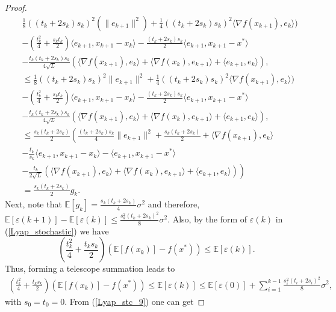 \documentclass{article}
\theoremstyle{plain}
\theoremstyle{definition}
\theoremstyle{remark}
\begin{document}
\begin{proof}
\begin{align}
            &\frac{1}{8}((t_k+2s_k)s_k)^2(\|e_{k+1}\|^2)+\frac{1}{4}((t_k+2s_k)s_k)^2\langle \nabla f(x_{k+1}) ,e_k \rangle)\nonumber\\
         & -(\frac{t_k^2}{4}+\frac{s_kt_k}{2})\langle e_{k+1},x_{k+1}-x_k\rangle-\frac{(t_k+2s_k)s_k}{2}\langle e_{k+1},x_{k+1}-x^*\rangle\nonumber\\
         &-\frac{t_k(t_k+2s_k)s_k}{4\sqrt{L}}\left(\langle \nabla f(x_{k+1}),e_k \rangle+\langle \nabla f(x_{k}) , e_{k+1}\rangle+\langle e_{k+1},e_k\rangle\right),\nonumber\\
         &\leq \frac{1}{8}((t_k+2s_k)s_k)^2\|e_{k+1}\|^2+\frac{1}{4}((t_k+2s_k)s_k)^2\langle \nabla f(x_{k+1}) ,e_k \rangle)\nonumber\\
         & -(\frac{t_k^2}{4}+\frac{s_kt_k}{2})\langle e_{k+1},x_{k+1}-x_k\rangle-\frac{(t_k+2s_k)s_k}{2}\langle e_{k+1},x_{k+1}-x^*\rangle\nonumber\\
         &-\frac{t_k(t_k+2s_k)s_k}{4\sqrt{L}}\left(\langle \nabla f(x_{k+1}),e_k \rangle+\langle \nabla f(x_{k}) , e_{k+1}\rangle+\langle e_{k+1},e_k\rangle\right),\nonumber\\
         &\leq \frac{s_k(t_k+2s_k)}{2}\left(\frac{(t_k+2s_k)s_k}{4}\|e_{k+1}\|^2+\frac{s_k(t_k+2s_k)}{2}+\langle \nabla f(x_{k+1}) ,e_k \rangle\right.\nonumber\\
         &-\frac{t_k}{s_k}\langle e_{k+1},x_{k+1}-x_k\rangle-\langle e_{k+1},x_{k+1}-x^*\rangle\nonumber\\
         &\left.-\frac{t_k}{2\sqrt{L}}\left(\langle \nabla f(x_{k+1}),e_k \rangle+\langle \nabla f(x_{k}) , e_{k+1}\rangle+\langle e_{k+1},e_k\rangle\right)\right)\nonumber\\
         &=\frac{s_k(t_k+2s_k)}{2}g_k.
        \end{align}
        Next, note that $\mathbb E[g_k]= \frac{s_k(t_k+2s_k)}{4}\sigma^2$ and therefore, $\mathbb E [\varepsilon(k+1)]-\mathbb E[ \varepsilon (k)]\leq \frac{s_k^2(t_k+2s_k)^2}{8}\sigma^2$. Also, by the form of $\varepsilon(k)$ in (\ref{Lyap_stochastic}) we have $$(\frac{t_k^2}{4}+\frac{t_{k}s_k}{2})(\mathbb E[f(x_k)]-f(x^*))\leq \mathbb E[\varepsilon(k)].$$
        Thus, forming a telescope summation leads to
        \begin{align}\label{Lyap_stc_9}
            (\frac{t_k^2}{4}+\frac{t_{k}s_k}{2})(\mathbb E[f(x_k)]-f(x^*))\leq\mathbb E[\varepsilon(k)]\leq \mathbb E[\varepsilon(0)] + \sum_{i=1}^{k-1} \frac{s_i^2(t_i+2s_i)^2}{8}\sigma^2,
        \end{align}
        with $s_0=t_0=0$. From (\ref{Lyap_stc_9}) one can get

\end{proof}
\end{document}
